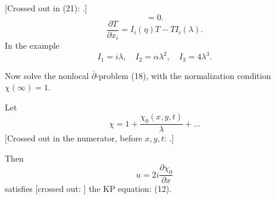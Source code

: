 [Crossed out in (21):
.]
\begin{equation*}
[I_i(\lambda),I_j(\eta)]=0. \tag{21}
\end{equation*}
\begin{equation*}
\frac{\partial T}{\partial x_i}=I_i(\eta)T-TI_i(\lambda). \tag{22}
\end{equation*}
In the example
\begin{equation*}
I_1=i\lambda,\quad I_2=\alpha\lambda^2,\quad I_3=4\lambda^3. \tag{23}
\end{equation*}

Now solve the nonlocal $\bar\partial$-problem (18), with the normalization condition $\chi(\infty)=1$.

Let
\begin{equation*}
\chi=1+\frac{\chi_0(x,y,t)}{\lambda}+\ldots \tag{24}
\end{equation*}
[Crossed out in the numerator, before $x,y,t$:
.]

Then
\begin{equation*}
u=2i\frac{\partial\chi_0}{\partial x} \tag{25}
\end{equation*}
satisfies [crossed out:
]
the KP equation: (12).


